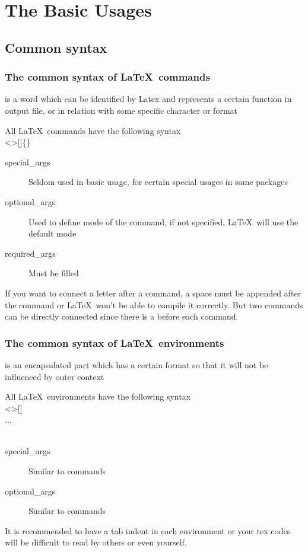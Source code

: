 \section{The Basic Usages}
\begin{frame}
\end{frame}

\subsection{Common syntax}

\begin{frame}
	\frametitle{The common syntax of \LaTeX\ commands}
	\begin{definition}
		 is a word which can be identified by Latex and represents a certain function in output file, or in relation with some specific character or format
	\end{definition}
	All \LaTeX\ commands have the following syntax\\
	\textless {}\textgreater []\{\}
	\begin{description}
		\item[special\_args]	Seldom used in basic usage, for certain special usages in some packages
		\item[optional\_args]	Used to define mode of the command, if not specified, \LaTeX\ will use the default mode
		\item[required\_args]	Must be filled
	\end{description}
	If you want to connect a letter after a command, a space must be appended after the command or \LaTeX\ won't be able to compile it correctly. But two commands can be directly connected since there is a \structure{\textbackslash} before each command.
\end{frame}

\begin{frame}
	\frametitle{The common syntax of \LaTeX\ environments}
	\begin{definition}
		 is an encapsulated part which has a certain format so that it will not be influenced by outer context
	\end{definition}
	All \LaTeX\ environments have the following syntax\\
	\textless {}\textgreater []\\
	\qquad...\\
	\\
	\begin{description}
		\item[special\_args]	Similar to commands
		\item[optional\_args]	Similar to commands
	\end{description}
	It is recommended to have a tab indent in each environment or your tex codes will be difficult to read by others or even \alert{yourself}.
\end{frame}

